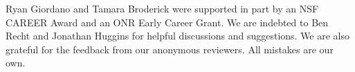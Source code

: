 Ryan Giordano and Tamara Broderick were supported in part by an NSF CAREER Award
and an ONR Early Career Grant.  We are indebted to Ben Recht and Jonathan
Huggins for helpful discussions and suggestions.  We are also
grateful for the feedback from our anonymous reviewers.  All mistakes are our own.

